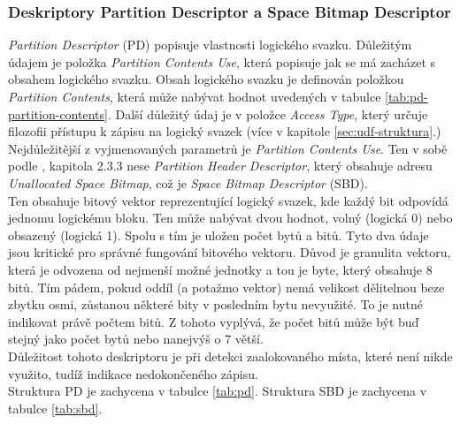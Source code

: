 \subsubsection{Deskriptory Partition Descriptor a Space Bitmap Descriptor}
\label{subsec:pd-sbd}
\textit{Partition Descriptor} (PD) popisuje vlastnosti logického svazku. Důležitým údajem je položka \textit{Partition Contents Use}, která popisuje jak se má zacházet s obsahem logického svazku. Obsah logického svazku je definován položkou \textit{Partition Contents}, která může nabývat hodnot uvedených v tabulce \ref{tab:pd-partition-contents}. Další důležitý údaj je v položce \textit{Access Type}, který určuje filozofii přístupu k zápisu na logický svazek (více v kapitole \ref{sec:udf-struktura}.)\\
Nejdůležitější z vyjmenovaných parametrů je \textit{Partition Contents Use}. Ten v sobě podle \cite{osta-udf-0201}, kapitola 2.3.3 nese \textit{Partition Header Descriptor}, který obsahuje adresu \textit{Unallocated Space Bitmap}, což je \textit{Space Bitmap Descriptor} (SBD).\\
Ten obsahuje bitový vektor reprezentující logický svazek, kde každý bit odpovídá jednomu logickému bloku. Ten může nabývat dvou hodnot, volný (logická 0) nebo obsazený (logická 1). Spolu s tím je uložen počet bytů a bitů. Tyto dva údaje jsou kritické pro správné fungování bitového vektoru. Důvod je granulita vektoru, která je odvozena od nejmenší možné jednotky a tou je byte, který obsahuje 8 bitů. Tím pádem, pokud oddíl (a potažmo vektor) nemá velikost dělitelnou beze zbytku osmi, zůstanou některé bity v posledním bytu nevyužité. To je nutné indikovat právě počtem bitů. Z tohoto vyplývá, že počet bitů může být buď stejný jako počet bytů nebo nanejvýš o 7 větší.\\
Důležitost tohoto deskriptoru je při detekci zaalokovaného místa, které není nikde využito, tudíž indikace nedokončeného zápisu.\\
Struktura PD je zachycena v tabulce \ref{tab:pd}. Struktura SBD je zachycena v tabulce \ref{tab:sbd}. 
